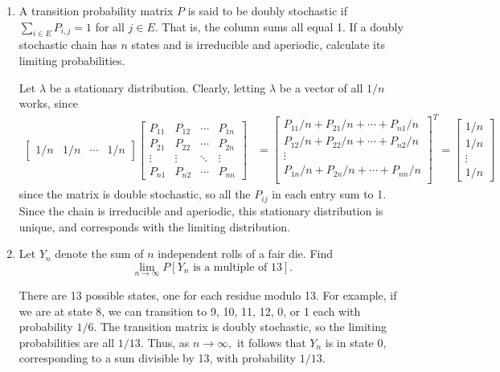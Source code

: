 \documentclass{article}
\begin{document}
\begin{enumerate}
	\item A transition probability matrix $P$ is said to be doubly stochastic if $\displaystyle\sum_{i\in E}^{} P_{i, j}= 1$ for all $j\in E.$ That is, the column sums all equal 1. If a doubly stochastic chain has $n$ states and is irreducible and aperiodic, calculate its limiting probabilities.
		\begin{soln}
			Let $\lambda$ be a stationary distribution. Clearly, letting $\lambda$ be a vector of all $1/n$ works, since
			\begin{align*}
				\begin{bmatrix}
					1/n & 1/n & \cdots & 1/n
				\end{bmatrix}\begin{bmatrix}
					P_{11} & P_{12} & \cdots & P_{1n} \\
					P_{21} & P_{22} & \cdots & P_{2n} \\
					\vdots & \vdots & \ddots & \vdots \\
					P_{n1} & P_{n2} & \cdots & P_{nn}
				\end{bmatrix}&=\begin{bmatrix}
					P_{11}/n + P_{21}/n+\cdots+P_{n1}/n \\
					P_{12}/n +P_{22}/n+\cdots+P_{n2}/n \\
					\vdots \\
					P_{1n}/n + P_{2n}/n+\cdots+P_{nn}/n \\
				\end{bmatrix}^T = \begin{bmatrix}
					1/n \\ 1/n \\ \vdots \\ 1/n
				\end{bmatrix}
			\end{align*}
			since the matrix is double stochastic, so all the $P_{ij}$ in each entry sum to 1. Since the chain is irreducible and aperiodic, this stationary distribution is unique, and corresponds with the limiting distribution.
		\end{soln}

	\item Let $Y_n$ denote the sum of $n$ independent rolls of a fair die. Find
		\[\lim_{n\to\infty} P[Y_n\text{ is a multiple of 13}].\]
		\begin{soln}
			There are 13 possible states, one for each residue modulo 13. For example, if we are at state 8, we can transition to 9, 10, 11, 12, 0, or 1 each with probability $1/6.$ The transition matrix is doubly stochastic, so the limiting probabilities are all $1/13.$ Thus, as $n\to\infty,$ it follows that $Y_n$ is in state 0, corresponding to a sum divisible by 13, with probability $1/13.$
		\end{soln}


\end{enumerate}
\end{document}
